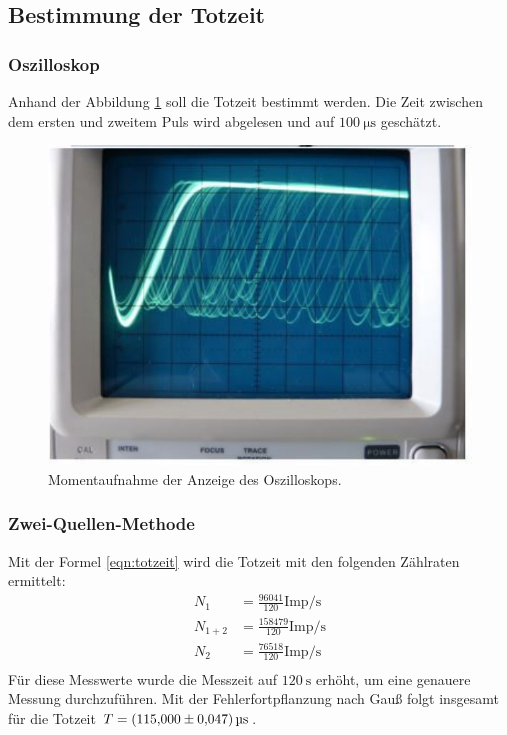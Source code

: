 \subsection{Bestimmung der Totzeit}
\label{subsec:Totzeit}

\subsubsection{Oszilloskop}
Anhand der Abbildung \ref{fig:Momentaufnahme} soll die Totzeit bestimmt werden.
Die Zeit zwischen dem ersten und zweitem Puls wird abgelesen und auf $\SI{100}{\micro\second}$ geschätzt.

\begin{figure}
  \centering
  \includegraphics[width=\textwidth]{Momentaufnahme.pdf}
  \caption{Momentaufnahme der Anzeige des Oszilloskops.\cite{anleitung}}
  \label{fig:Momentaufnahme}
\end{figure}

\subsubsection{Zwei-Quellen-Methode}
Mit der Formel \eqref{eqn:totzeit} wird die Totzeit mit den folgenden Zählraten ermittelt:
\begin{align*}
  N_1 &= \frac{96041}{120} \text{Imp/s} \\
  N_{1+2} &= \frac{158479}{120} \text{Imp/s} \\
  N_2 &= \frac{76518}{120} \text{Imp/s} \\
\end{align*}
Für diese Messwerte wurde die Messzeit auf $\SI{120}{\second}$ erhöht, um eine genauere Messung durchzuführen.
Mit der Fehlerfortpflanzung nach Gauß folgt insgesamt für die Totzeit $T = \SI{115 \pm 0.047}{\micro\second}$.

